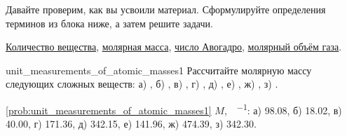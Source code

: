Давайте проверим, как вы усвоили материал. Сформулируйте определения терминов из блока ниже, а затем решите задачи.

\begin{termlist}
    \hyperref[term:amount_of_substance]{Количество вещества},
    \hyperref[term:molar_mass]{молярная масса},
    \hyperref[term:Avogadro_constant]{число Авогадро},
    \hyperref[term:molar_volume]{молярный объём газа}.
\end{termlist}

\begin{problem}{}{unit_measurements_of_atomic_masses1}
    Рассчитайте молярную массу следующих сложных веществ: а) , б) , в) , г) , д) , е) , ж) , з) .
    \begin{sol}{\ref{prob:unit_measurements_of_atomic_masses1}}
        $M$,~\unit{\ruG\per\ruMole}: а) \num{98,08}, б) \num{18,02}, в) \num{40,00}, г) \num{171,36}, д) \num{342,15}, е) \num{141,96}, ж) \num{474,39}, з) \num{342,30}.
    \end{sol}
\end{problem}

